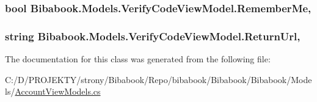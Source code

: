 \subsubsection[{Remember\+Me}]{\setlength{\rightskip}{0pt plus 5cm}bool Bibabook.\+Models.\+Verify\+Code\+View\+Model.\+Remember\+Me\hspace{0.3cm}{\ttfamily [get]}, {\ttfamily [set]}}\label{class_bibabook_1_1_models_1_1_verify_code_view_model_a10164dd3b97f912de914f8d819184954}
\hypertarget{class_bibabook_1_1_models_1_1_verify_code_view_model_a998b3a7f2f7673c53422fd2a704fbc75}{}
\subsubsection[{Return\+Url}]{\setlength{\rightskip}{0pt plus 5cm}string Bibabook.\+Models.\+Verify\+Code\+View\+Model.\+Return\+Url\hspace{0.3cm}{\ttfamily [get]}, {\ttfamily [set]}}\label{class_bibabook_1_1_models_1_1_verify_code_view_model_a998b3a7f2f7673c53422fd2a704fbc75}


The documentation for this class was generated from the following file\+:\begin{DoxyCompactItemize}
\item 
C\+:/\+D/\+P\+R\+O\+J\+E\+K\+T\+Y/strony/\+Bibabook/\+Repo/bibabook/\+Bibabook/\+Bibabook/\+Models/\hyperlink{_account_view_models_8cs}{Account\+View\+Models.\+cs}\end{DoxyCompactItemize}
